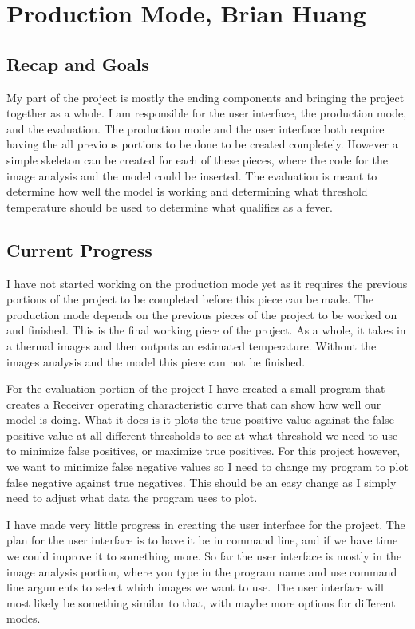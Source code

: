 \documentclass[onecolumn, draftclsnofoot,10pt, compsoc]{IEEEtran}
\begin{document}
\section{Production Mode, Brian Huang}

\subsection{Recap and Goals}
My part of the project is mostly the ending components and bringing the project together as a whole. I am responsible for the user interface, the production mode, and the evaluation. The production mode and the user interface both require having the all previous portions to be done to be created completely. However a simple skeleton can be created for each of these pieces, where the code for the image analysis and the model could be inserted. The evaluation is meant to determine how well the model is working and determining what threshold temperature should be used to determine what qualifies as a fever.

\subsection{Current Progress}
I have not started working on the production mode yet as it requires the previous portions of the project to be completed before this piece can be made. The production mode depends on the previous pieces of the project to be worked on and finished. This is the final working piece of the project. As a whole, it takes in a thermal images and then outputs an estimated temperature. Without the images analysis and the model this piece can not be finished.

For the evaluation portion of the project I have created a small program that creates a Receiver operating characteristic curve that can show how well our model is doing. What it does is it plots the true positive value against the false positive value at all different thresholds to see at what threshold we need to use to minimize false positives, or maximize true positives. For this project however, we want to minimize false negative values so I need to change my program to plot false negative against true negatives. This should be an easy change as I simply need to adjust what data the program uses to plot.

I have made very little progress in creating the user interface for the project. The plan for the user interface is to have it be in command line, and if we have time we could improve it to something more. So far the user interface is mostly in the image analysis portion, where you type in the program name and use command line arguments to select which images we want to use. The user interface will most likely be something similar to that, with maybe more options for different modes.
\end{document}
